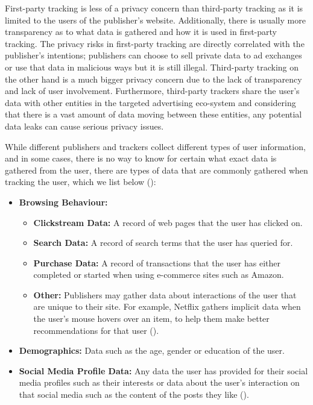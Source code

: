 \documentclass{l4proj}
\begin{document}
First-party tracking is less of a privacy concern than third-party tracking as it is limited to the users of the publisher's website. Additionally, there is usually more transparency as to what data is gathered and how it is used in first-party tracking. The privacy risks in first-party tracking are directly correlated with the publisher's intentions; publishers can choose to sell private data to ad exchanges or use that data in malicious ways but it is still illegal. Third-party tracking on the other hand is a much bigger privacy concern due to the lack of transparency and lack of user involvement. Furthermore, third-party trackers share the user's data with other entities in the targeted advertising eco-system and considering that there is a vast amount of data moving between these entities, any potential data leaks can cause serious privacy issues. 

While different publishers and trackers collect different types of user information, and in some cases, there is no way to know for certain what exact data is gathered from the user, there are types of data that are commonly gathered when tracking the user, which we list below (\cite{addata}):
\begin{itemize}
   \item 
   \textbf{Browsing Behaviour:}
   \begin{itemize}
	\item
           \textbf{Clickstream Data:} A record of web pages that the user has clicked on.
	\item
           \textbf{Search Data:} A record of search terms that the user has queried for.
	\item
           \textbf{Purchase Data:} A record of transactions that the user has either completed or started when using e-commerce sites such as Amazon.
	\item
           \textbf{Other:} Publishers may gather data about interactions of the user that are unique to their site. For example, Netflix gathers implicit data when the user's mouse hovers over an item, to help them make better recommendations for that user (\cite{netflix}).
   \end{itemize}
   \item
   \textbf{Demographics:} Data such as the age, gender or education of the user.
   \item
   \textbf{Social Media Profile Data:} Any data the user has provided for their social media profiles such as their interests or data about the user's interaction on that social media such as the content of the posts they like (\cite{fbook}).
\end{itemize}
\end{document}
